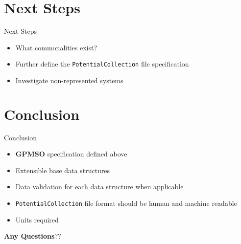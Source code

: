 \documentclass[xcolor=table]{beamer}
\begin{document}
\section{Next Steps}
\begin{frame}{Next Steps}
    \begin{itemize}
        \item What commonalities exist?
        \item Further define the \texttt{PotentialCollection} file specification
         \item Investigate non-represented systems

    \end{itemize}
\end{frame}

\section{Conclusion}
\begin{frame}{Conclusion}
    \begin{itemize}
        \item \textbf{GPMSO} specification defined above
        \item Extensible base data structures
        \item Data validation for each data structure when applicable
        \item \texttt{PotentialCollection} file format should be human and machine readable
        \item Units required
    \end{itemize}
    \vspace{2em}
    \large \textbf{Any Questions}??
\end{frame}
\end{document}
